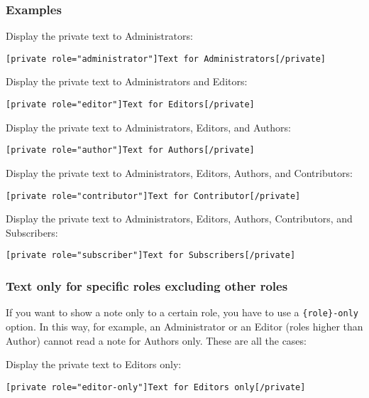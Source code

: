 \documentclass[
	titlepage,
	headinclude,
	abstract=on,
	paper=a4,
	fontsize=11pt,
]{scrartcl}
\begin{document}
\subsubsection{Examples}

Display the private text to Administrators:

\begin{lstlisting}
[private role="administrator"]Text for Administrators[/private]
\end{lstlisting}

Display the private text to Administrators and Editors:

\begin{lstlisting}
[private role="editor"]Text for Editors[/private]
\end{lstlisting}

Display the private text to Administrators, Editors, and Authors:

\begin{lstlisting}
[private role="author"]Text for Authors[/private]
\end{lstlisting}

Display the private text to Administrators, Editors, Authors, and Contributors:

\begin{lstlisting}
[private role="contributor"]Text for Contributor[/private]
\end{lstlisting}

Display the private text to Administrators, Editors, Authors, Contributors, and Subscribers:

\begin{lstlisting}
[private role="subscriber"]Text for Subscribers[/private]
\end{lstlisting}

\subsubsection{Text only for specific roles excluding other roles}

If you want to show a note only to a certain role, you have to use a \verb+{role}-only+ option. In this way, for example, an Administrator or an Editor (roles higher than Author) cannot read a note for Authors only. These are all the cases:

Display the private text to Editors only:

\begin{lstlisting}
[private role="editor-only"]Text for Editors only[/private]
\end{lstlisting}
\end{document}
